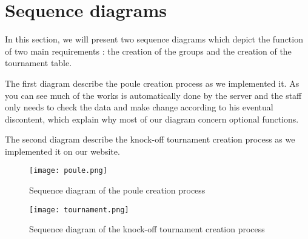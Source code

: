 \section{Sequence diagrams}
\label{Sequence diagrams}

In this section, we will present two sequence diagrams which depict the
function of two main requirements : the creation of the groups and the creation
of the tournament table. \newline

The first diagram describe the poule creation process as we implemented it. As
you can see much of the works is automatically done by the server and the staff
only needs to check the data and make change according to his eventual
discontent, which explain why most of our diagram concern optional functions.
\newline

The second diagram describe the knock-off tournament creation process as we
implemented it on our website. \newline

\begin{figure}[!ht]
	\centering
	\texttt{[image: poule.png]}
	\caption{Sequence diagram of the poule creation process}
	\label{fig:length_eight_mouse}
\end{figure}
\FloatBarrier

\begin{figure}[!ht]
	\centering
	\texttt{[image: tournament.png]}
	\caption{Sequence diagram of the knock-off tournament creation process}
	\label{fig:length_eight_mouse}
\end{figure}
\FloatBarrier
